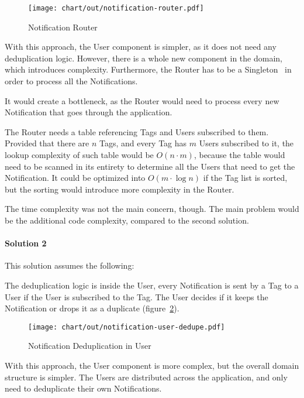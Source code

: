 \begin{figure}[h]
  \centering
  \texttt{[image: chart/out/notification-router.pdf]}
  \caption{Notification Router}
  \label{fig:notification-router}
\end{figure}

With this approach,
the User component is simpler,
as it does not need any deduplication logic.
However, there is a whole new component
in the domain, which introduces complexity.
Furthermore, the Router has to be
a Singleton~\cite[pp.~127-134]{gamma_design_1994}
in order to process all the Notifications.

It would create a bottleneck,
as the Router would need to process every new Notification
that goes through the application.

The Router needs a table referencing
Tags and Users subscribed to them.
Provided that there are $n$ Tags,
and every Tag has $m$ Users subscribed to it,
the lookup complexity of such table
would be $O(n \cdot m)$,
because the table would need to be
scanned in its entirety to determine
all the Users that need to get the Notification.
It could be optimized into $O(m \cdot \log n)$
if the Tag list is sorted,
but the sorting would introduce
more complexity in the Router.

The time complexity was not the main concern, though.
The main problem would be
the additional code complexity,
compared to the second solution.

\paragraph*{Solution 2}\label{par:duplication-solution-2}

This solution assumes the following:

The deduplication logic is inside the User,
every Notification is sent by a Tag to a User
if the User is subscribed to the Tag.
The User decides if it keeps the Notification
or drops it as a duplicate
(figure~\ref{fig:notification-user-dedupe}).

\begin{figure}[h]
  \centering
  \texttt{[image: chart/out/notification-user-dedupe.pdf]}
  \caption{Notification Deduplication in User}
  \label{fig:notification-user-dedupe}
\end{figure}

With this approach,
the User component is more complex,
but the overall domain structure is simpler.
The Users are distributed across the application,
and only need to deduplicate their own Notifications.

